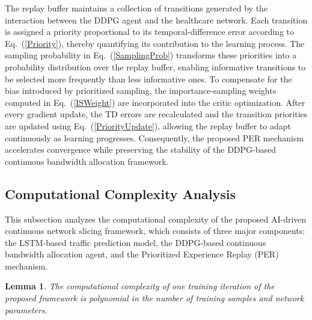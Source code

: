 \documentclass[10pt,journal,compsoc]{IEEEtran}
\newtheorem{lemma}{Lemma}
\begin{document}
The replay buffer maintains a collection of transitions generated by the interaction between the DDPG agent and the healthcare network. Each transition is assigned a priority proportional to its temporal-difference error according to Eq.~(\ref{Priority}), thereby quantifying its contribution to the learning process. The sampling probability in Eq.~(\ref{SamplingProb}) transforms these priorities into a probability distribution over the replay buffer, enabling informative transitions to be selected more frequently than less informative ones. To compensate for the bias introduced by prioritized sampling, the importance-sampling weights computed in Eq.~(\ref{ISWeight}) are incorporated into the critic optimization. After every gradient update, the TD errors are recalculated and the transition priorities are updated using Eq.~(\ref{PriorityUpdate}), allowing the replay buffer to adapt continuously as learning progresses. Consequently, the proposed PER mechanism accelerates convergence while preserving the stability of the DDPG-based continuous bandwidth allocation framework.



\subsection{Computational Complexity Analysis}
\label{Complexity}

This subsection analyzes the computational complexity of the proposed AI-driven continuous network slicing framework, which consists of three major components: the LSTM-based traffic prediction model, the DDPG-based continuous bandwidth allocation agent, and the Prioritized Experience Replay (PER) mechanism.

\begin{lemma}
\label{lemma_complexity}
The computational complexity of one training iteration of the proposed framework is polynomial in the number of training samples and network parameters.
\end{lemma}
\end{document}
